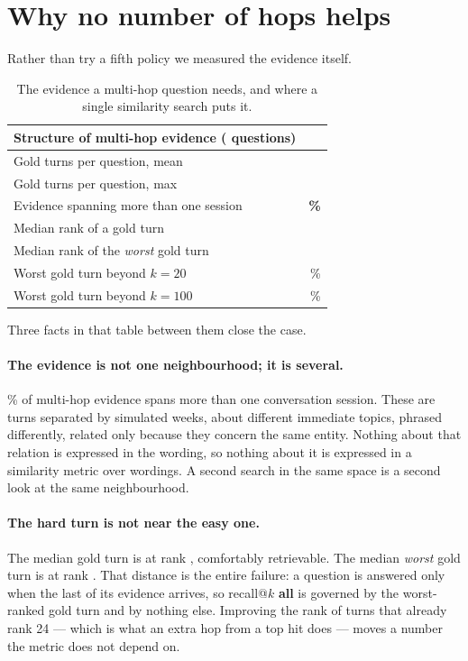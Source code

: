 \section{Why no number of hops helps}
\label{sec:diagnostic}

Rather than try a fifth policy we measured the evidence itself.

\begin{table}[h]
\centering
\begin{tabular}{lr}
\toprule
\textbf{Structure of multi-hop evidence (\rQmulti{} questions)} & \\
\midrule
Gold turns per question, mean              & \rGoldAvg{} \meas{} \\
Gold turns per question, max               & \rGoldMax{} \meas{} \\
Evidence spanning more than one session    & \textbf{\rSpanSessions{}\%} \meas{} \\
\midrule
Median rank of a gold turn                 & \rMedRank{} \meas{} \\
Median rank of the \emph{worst} gold turn  & \textbf{\rMedWorst{}} \meas{} \\
Worst gold turn beyond $k{=}20$            & \rBeyondTwenty{}\% \meas{} \\
Worst gold turn beyond $k{=}100$           & \rBeyondHundred{}\% \meas{} \\
\bottomrule
\end{tabular}
\caption{The evidence a multi-hop question needs, and where a single similarity
search puts it.}
\label{tab:diagnostic}
\end{table}

Three facts in that table between them close the case.

\paragraph{The evidence is not one neighbourhood; it is several.}
\rSpanSessions{}\% of multi-hop evidence spans more than one conversation
session. These are turns separated by simulated weeks, about different immediate
topics, phrased differently, related only because they concern the same entity.
Nothing about that relation is expressed in the wording, so nothing about it is
expressed in a similarity metric over wordings. A second search in the same space
is a second look at the same neighbourhood.

\paragraph{The hard turn is not near the easy one.}
The median gold turn is at rank \rMedRank{}, comfortably retrievable. The median
\emph{worst} gold turn is at rank \rMedWorst{}. That distance is the entire
failure: a question is answered only when the last of its evidence arrives, so
recall@$k$ \textbf{all} is governed by the worst-ranked gold turn and by nothing
else. Improving the rank of turns that already rank 24 --- which is what an extra
hop from a top hit does --- moves a number the metric does not depend on.

